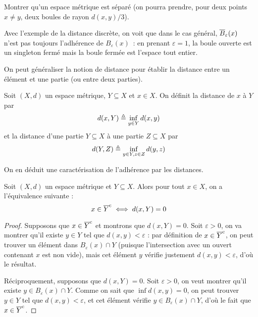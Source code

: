 \begin{exercise}
  Montrer qu'un espace métrique est séparé (on pourra prendre, pour deux points
  $x\neq y$, deux boules de rayon $d(x,y)/3$).
\end{exercise}

\begin{remark}
  Avec l'exemple de la distance discrète, on voit que dans le cas général,
  $\overline{B}_\varepsilon(x)$ n'est pas toujours l'adhérence de $B_\varepsilon(x)$~: en
  prenant $\varepsilon = 1$, la boule ouverte est un singleton fermé mais la
  boule fermée est l'espace tout entier.
\end{remark}

On peut généraliser la notion de distance pour établir la distance entre un
élément et une partie (ou entre deux parties).

\begin{definition}
  Soit $(X,d)$ un espace métrique, $Y\subseteq X$ et $x\in X$. On définit la
  distance de $x$ à $Y$ par
  \[d(x,Y)\triangleq \inf_{y\in Y} d(x,y)\]
  et la distance d'une partie $Y\subseteq X$ à une partie $Z\subseteq X$ par
  \[d(Y,Z)\triangleq \inf_{y\in Y, z \in Z} d(y,z)\]
\end{definition}

On en déduit une caractérisation de l'adhérence par les distances.

\begin{proposition}
  Soit $(X,d)$ un espace métrique et $Y\subseteq X$. Alors pour tout $x\in X$,
  on a l'équivalence suivante :
  \[x\in \overline{Y}^{\mathrm c} \iff d(x,Y) = 0\]
\end{proposition}

\begin{proof}
  Supposons que $x\in \overline{Y}^{\mathrm c}$ et montrons que $d(x,Y) = 0$. Soit
  $\varepsilon > 0$, on va montrer qu'il existe $y\in Y$ tel que
  $d(x,y)< \varepsilon$ : par définition de $x\in \overline{Y}^{\mathrm c}$, on peut trouver
  un élément dans $B_\varepsilon(x)\cap Y$ (puisque l'intersection avec un
  ouvert contenant $x$ est non vide), mais cet élément $y$ vérifie justement
  $d(x,y) < \varepsilon$, d'où le résultat.

  Réciproquement, supposons que $d(x,Y) = 0$. Soit $\varepsilon > 0$, on veut
  montrer qu'il existe $y\in B_\varepsilon(x)\cap Y$. Comme on sait que
  $\inf d(x,y) = 0$, on peut trouver $y\in Y$ tel que $d(x,y) <\varepsilon$,
  et cet élément vérifie $y\in B_\varepsilon(x)\cap Y$, d'où le fait que
  $x\in \overline{Y}^{\mathrm c}$.
\end{proof}

